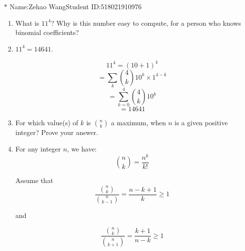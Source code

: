 \documentclass[12pt,a4paper]{article}
\makeatletter
\newtheorem*{solution}{Solution}
\theoremstyle{definition}
\renewenvironment{solution}[1][Solution] {\par\pushQED{\qed}\normalfont\topsep6\p@\@plus6\p@\relax\trivlist\item[\hskip\labelsep\bfseries#1\@addpunct{.}]\ignorespaces}{\popQED\endtrivlist\@endpefalse} \makeatother
\makeatother
\begin{document}
\noindent

\noindent{}
\begin{center}
\footnotesize{\color{blue}$*$ Name:Zehao Wang\quad Student ID:518021910976}
\end{center}

\begin{enumerate}
    \item 
        What is $11^4$? Why is this number easy to compute, for a person who knows binomial coefficients?
        \begin{solution}
        	$11^4=14641$.
        	
        	\begin{equation*}
        	    11^4=(10+1)^4
        	\end{equation*}
            \begin{equation*}    
        	    =\sum_{k} \binom{4}{k} 10^k\times 1^{4-k}
        	\end{equation*}  
            \begin{equation*} 
        	    =\sum_{k=0}^{4} \binom{4}{k} 10^k
        	\end{equation*}
            \begin{equation*}   
        	    =14641
        	\end{equation*}
        \end{solution}
    \item 
        For which value(s) of $k$ is $\binom{n}{k}$ a maximum, when $n$ is a given positive integer? Prove your answer.
        \begin{solution}
        	For any integer $n$, we have:
        	\begin{equation*}
        	    \binom{n}{k}=\frac{n^{\underline{k}}}{k!}
        	\end{equation*}
        	
        	Assume that 
        	\begin{equation}\label{T2_1}
        	   \frac {\binom{n}{k}}{\binom{n}{k-1}}=\frac{n-k+1}{k}\ge 1
        	\end{equation}
        	
        	and
        	
        	\begin{equation}\label{T2_2}
        	   \frac{\binom{n}{k}}{\binom{n}{k+1}}=\frac{k+1}{n-k}\ge 1
        	\end{equation}
        	

\end{solution}
\end{enumerate}
\end{document}
